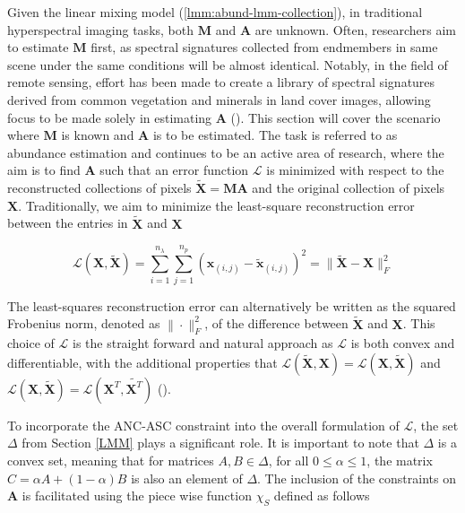 Given the linear mixing model (\eqref{lmm:abund-lmm-collection}), in traditional hyperspectral imaging tasks, both $\mathbf{M}$ and $\mathbf{A}$ are unknown. Often, researchers aim to estimate $\mathbf{M}$ first, as spectral signatures collected from endmembers in same scene under the same conditions will be almost identical. Notably, in the field of remote sensing, effort has been made to create a library of spectral signatures derived from common vegetation and minerals in land cover images, allowing focus to be made solely in estimating $\mathbf{A}$ (\cite{ECOSTRESS}). This section will cover the scenario where $\mathbf{M}$ is known and $\mathbf{A}$ is to be estimated. The task is referred to as abundance estimation and continues to be an active area of research, where the aim is to find $\mathbf{A}$ such that an error function $\mathcal{L}$ is minimized with respect to the reconstructed collections of pixels $\tilde{\mathbf{X}} = \mathbf{MA}$ and the original collection of pixels $\mathbf{X}$. Traditionally, we aim to minimize the least-square reconstruction error between the entries in $\tilde{\mathbf{X}}$ and $\mathbf{X}$

\begin{equation}
    \label{ae:fnorm}
    \mathcal{L}(\mathbf{X},\tilde{\mathbf{X}}) = \sum_{i=1}^{n_\lambda} \sum_{j=1}^{n_p} \left(\mathbf{x}_{(i,j)} - \tilde{\mathbf{x}}_{(i,j)}\right)^2 = \|\tilde{\mathbf{X}} - \mathbf{X}\|_F^2 
\end{equation}

The least-squares reconstruction error can alternatively be written as the squared Frobenius norm, denoted as $\|\cdot\|_F^2$, of the difference between  $\tilde{\mathbf{X}}$ and $\mathbf{X}$. This choice of $\mathcal{L}$ is the straight forward and natural approach as $\mathcal{L}$ is both convex and differentiable, with the additional properties that $\mathcal{L}(\tilde{\mathbf{X}},\mathbf{X}) = \mathcal{L}(\mathbf{X},\tilde{\mathbf{X}})$ and $ \mathcal{L}(\mathbf{X},\tilde{\mathbf{X}}) = \mathcal{L}(\mathbf{X}^T,\tilde{\mathbf{X}^T})$ (\cite{UNMIX}).

To incorporate the ANC-ASC constraint into the overall formulation of $\mathcal{L}$, the set $\Delta$ from Section \ref{LMM} plays a significant role. It is important to note that $\Delta$ is a convex set, meaning that for matrices $A, B \in \Delta$, for all $0 \leq \alpha \leq 1$, the matrix $C = \alpha A + (1- \alpha)B$ is also an element of $\Delta$. The inclusion of the constraints on $\mathbf{A}$ is facilitated using the piece wise function $\chi_S$ defined as follows

